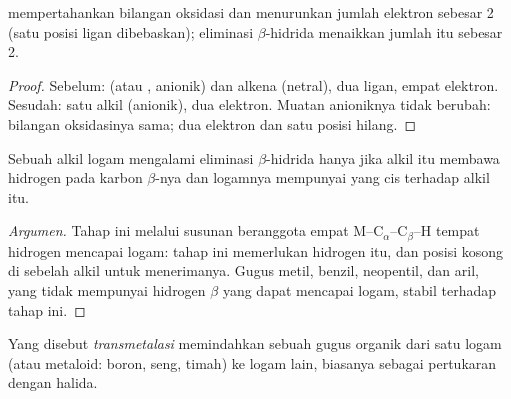 \begin{proposition}\label{prop:b2:catalytic-cycles:insertion}
 mempertahankan bilangan oksidasi dan menurunkan jumlah
elektron sebesar 2 (satu posisi ligan dibebaskan); eliminasi $\beta$-hidrida
menaikkan jumlah itu sebesar 2.
\end{proposition}

\begin{proof}
Sebelum:  (atau , anionik) dan alkena (netral), dua ligan,
empat elektron. Sesudah: satu alkil (anionik), dua elektron. Muatan
anioniknya tidak berubah: bilangan oksidasinya sama; dua elektron dan satu
posisi hilang.
\end{proof}

\begin{proposition}\label{prop:b2:catalytic-cycles:beta-h}
Sebuah alkil logam mengalami eliminasi $\beta$-hidrida hanya jika alkil itu
membawa hidrogen pada karbon $\beta$-nya dan logamnya mempunyai 
yang cis terhadap alkil itu.
\end{proposition}

\begin{proof}[Argumen]
Tahap ini melalui susunan beranggota empat M--C$_\alpha$--C$_\beta$--H tempat
hidrogen mencapai logam: tahap ini memerlukan hidrogen itu, dan posisi
kosong di sebelah alkil untuk menerimanya. Gugus metil, benzil, neopentil,
dan aril, yang tidak mempunyai hidrogen $\beta$
yang dapat mencapai logam, stabil terhadap tahap ini.
\end{proof}

\begin{definition}[Transmetalasi]\label{def:b2:catalytic-cycles:transmetalation}
Yang disebut \emph{transmetalasi} memindahkan sebuah
gugus organik dari satu logam (atau metaloid: boron, seng, timah) ke logam
lain, biasanya sebagai pertukaran dengan halida.
\end{definition}

